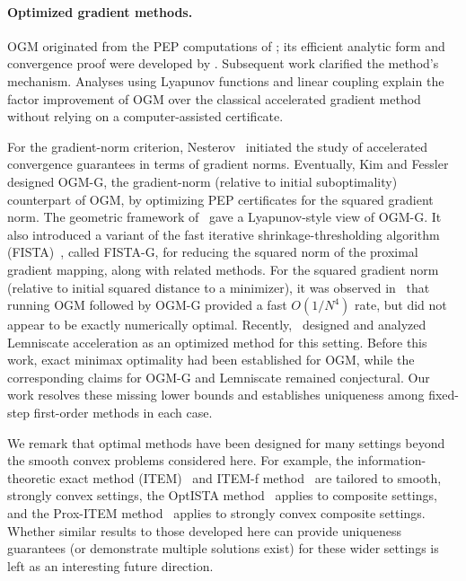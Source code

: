 \documentclass[11pt]{article}
\begin{document}
\paragraph{Optimized gradient methods.}
OGM originated from the PEP computations
of \cite{DT14}; its efficient analytic form and convergence proof were
developed by \cite{KF16}.
Subsequent work clarified the method's mechanism. Analyses using Lyapunov functions and
linear coupling \cite{park2021factor,d2021acceleration}
explain the factor improvement of OGM over the classical
accelerated gradient method without relying on a computer-assisted
certificate.

For the gradient-norm criterion, Nesterov~\cite{nesterov2012make} initiated the study of accelerated convergence guarantees in terms of gradient norms. Eventually, Kim and Fessler~\cite{KF21} designed OGM-G, the gradient-norm (relative to initial suboptimality) counterpart of OGM, by optimizing PEP certificates for the squared gradient norm. The geometric framework of~\cite{lee2021geometric} gave a Lyapunov-style view of OGM-G. It also introduced a variant of the fast iterative shrinkage-thresholding algorithm (FISTA)~\cite{beck2009fast}, called FISTA-G, for reducing the squared norm of the proximal gradient mapping, along with related methods. 
For the squared gradient norm (relative to initial squared distance to a minimizer), it was observed in~\cite{KF21} that running OGM followed by OGM-G provided a fast $O(1/N^4)$ rate, but did not appear to be exactly numerically optimal. Recently,~\cite{KimRyuDasGupta26} designed and analyzed Lemniscate acceleration as an optimized method for this setting. Before this work, exact minimax optimality had been established for OGM, while the corresponding claims for OGM-G and Lemniscate remained conjectural. Our work resolves these missing lower bounds and establishes uniqueness among fixed-step first-order methods in each case.

We remark that optimal methods have been designed for many settings beyond the smooth convex problems considered here. For example, the information-theoretic exact method (ITEM)~\cite{taylordrori2022} and ITEM-f method~\cite{KimRyuDasGupta26} are tailored to smooth, strongly convex settings, the OptISTA method~\cite{jang2025computer} applies to composite settings, and the Prox-ITEM method~\cite{upadhyaya2026optimalfirstordermethodsmooth} applies to strongly convex composite settings. Whether similar results to those developed here can provide uniqueness guarantees (or demonstrate multiple solutions exist) for these wider settings is left as an interesting future direction.
\end{document}
